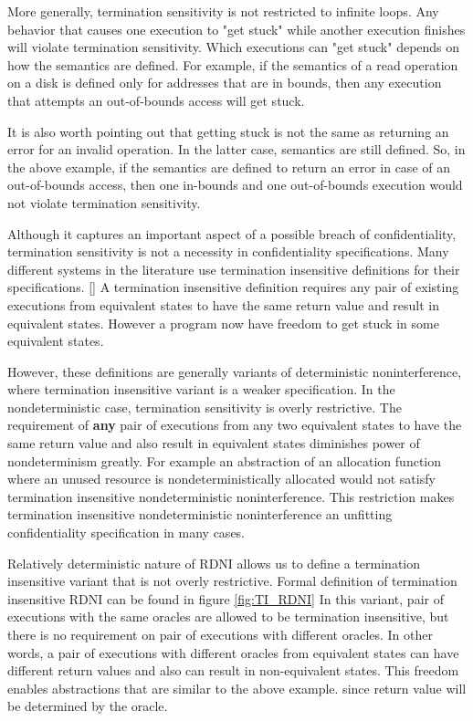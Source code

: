 More generally, termination sensitivity is not restricted to infinite loops. Any behavior that causes one execution to "get stuck" while another execution finishes will violate termination sensitivity. Which executions can "get stuck" depends on how the semantics are defined. For example, if the semantics of a read operation on a disk is defined only for addresses that are in bounds, then any execution that attempts an out-of-bounds access will get stuck. 

It is also worth pointing out that getting stuck is not the same as returning an error for an invalid operation. In the latter case, semantics are still defined. So, in the above example, if the semantics are defined to return an error in case of an out-of-bounds access, then one in-bounds and one out-of-bounds execution would not violate termination sensitivity.

Although it captures an important aspect of a possible breach of confidentiality, termination sensitivity is not a necessity in confidentiality specifications. Many different systems in the literature use termination insensitive definitions for their specifications. \ref{} A termination insensitive definition requires any pair of existing executions from equivalent states to have the same return value and result in equivalent states. However a program now have freedom to get stuck in some equivalent states.

However, these definitions are generally variants of deterministic noninterference, where termination insensitive variant is a weaker specification. In the nondeterministic case, termination sensitivity is overly restrictive. The requirement of \textbf{any} pair of executions from any two equivalent states to have the same return value and also result in equivalent states diminishes power of nondeterminism greatly. For example an abstraction of an allocation function where an unused resource is nondeterministically allocated would not satisfy termination insensitive nondeterministic noninterference. This restriction makes termination insensitive nondeterministic noninterference an unfitting confidentiality specification in many cases.

Relatively deterministic nature of RDNI allows us to define a termination insensitive variant that is not overly restrictive. Formal definition of termination insensitive RDNI can be found in figure \ref{fig:TI_RDNI} In this variant, pair of executions with the same oracles are allowed to be termination insensitive, but there is no requirement on pair of executions with different oracles. In other words, a pair of executions with different oracles from equivalent states can have different return values and also can result in non-equivalent states. This freedom enables abstractions that are similar to the above example. since return value will be determined by the oracle.

